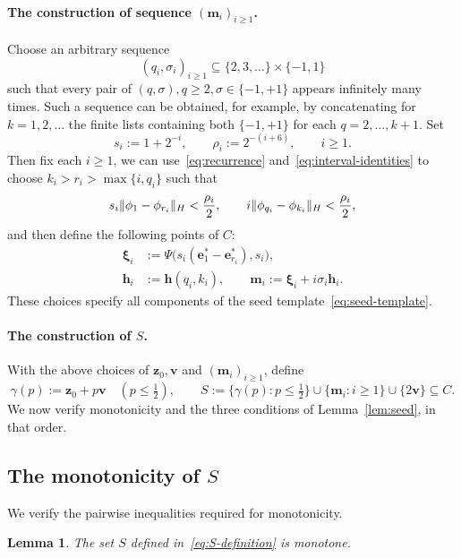 \documentclass[11pt,a4paper]{article}
\theoremstyle{reportstyle}
\newtheorem{lemma}{Lemma}
\numberwithin{equation}{section}
\newcommand{\be}{\mathbf e}
\newcommand{\bv}{\mathbf v}
\newcommand{\bz}{\mathbf z}
\newcommand{\bm}{\mathbf m}
\newcommand{\bh}{\mathbf h}
\newcommand{\bxi}{\boldsymbol\xi}
\DeclarePairedDelimiter{\norm}{\lVert}{\rVert}
\begin{document}
	\paragraph{The construction of sequence $(\bm_i)_{i\geq1}$.}
	Choose an arbitrary sequence
	$$(q_i,\sigma_i)_{i\ge1}\subseteq\{2,3,\ldots\}\times\{-1,1\}$$
	such that every pair of $(q,\sigma), q\geq2,\sigma\in\{-1,+1\}$ appears infinitely many times. Such a sequence can be obtained, for example, by concatenating for
	$k=1,2,\ldots$ the finite lists containing both $\{-1,+1\}$ for each
	$q=2,\ldots,k+1$. Set
	\begin{equation*}
		s_i:=1+2^{-i},\qquad \rho_i:=2^{-(i+6)},\qquad i\ge1.
	\end{equation*}
	Then fix each $i\geq 1$, we can use~\eqref{eq:recurrence} and~\eqref{eq:interval-identities} to choose
	$k_i>r_i>\max\{i,q_i\}$ such that
	\begin{equation}
		s_i\norm{\phi_1-\phi_{r_i}}_H<\frac{\rho_i}{2}, \qquad i\norm{\phi_{q_i}-\phi_{k_i}}_H<\frac{\rho_i}{2},
		\label{eq:close-indices}
	\end{equation}
	and then define the following points of $C$:
	\begin{align}
		\bxi_i&:=\Psi\bigl(s_i(\be_1^*-\be_{r_i}^*),s_i\bigr),
		\label{eq:xi-definition}\\
		\bh_i&:=\bh(q_i,k_i), \qquad \bm_i:=\bxi_i+ i \sigma_i \bh_i.
		\label{eq:mi-definition}
	\end{align}
	These choices specify all components of the seed template~\eqref{eq:seed-template}.

	\paragraph{The construction of $S$.}
	With the above choices of $\bz_0,\bv$ and $(\bm_i)_{i\geq1}$, define
	\begin{equation}
		\gamma(p):=\bz_0+p\bv\quad(p\le\tfrac12), \qquad S:=\{\gamma(p):p\le\tfrac12\} \cup\{\bm_i:i\ge1\}\cup\{2\bv\}\subseteq C.
		\label{eq:S-definition}
	\end{equation}
	We now verify monotonicity and the three conditions of
	Lemma~\ref{lem:seed}, in that order.

	\subsection{The monotonicity of \texorpdfstring{$S$}{S}}
	\label{subsec:monotonicity}
	We verify the pairwise inequalities required for monotonicity.
	\begin{lemma}
		\label{lem:S-monotone}
		The set $S$ defined in~\eqref{eq:S-definition} is monotone.
	\end{lemma}
\end{document}
